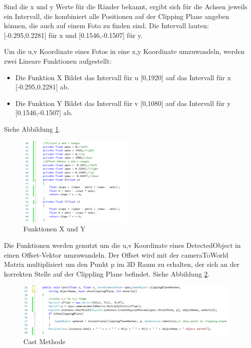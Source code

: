 \documentclass[german,a4paper, 12pt]{llncs}
\begin{document}
Sind die x und y Werte für die Ränder bekannt, ergibt sich für die Achsen jeweils ein Intervall, die kombiniert alle Positionen auf der Clipping Plane angeben können, die auch auf einem Foto zu finden sind. Die Intervall lauten: [-0.295,0.2281] für x und [0.1546,-0.1507] für y.

Um die u,v Koordinate eines Fotos in eine x,y Koordinate umzuwandeln, werden zwei Lineare Funktionen aufgestellt:
\begin{itemize}
	\item Die Funktion X Bildet das Intervall für u [0,1920] auf das Intervall für x [-0.295,0.2281] ab.
	\item Die Funktion Y Bildet das Intervall für v [0,1080] auf das Intervall für y [0.1546,-0.1507] ab.
\end{itemize}
Siehe Abbildung \ref{code:uvtoxy}.
\begin{figure}[H]
	\centering
	\includegraphics[width=0.5\textwidth]{images/code_uv_to_xy_scale.PNG}
	\caption[]{Funktionen X und Y}
	\label{code:uvtoxy}
\end{figure}

Die Funktionen werden genutzt um die u,v Koordinate eines DetectedObject in einen Offset-Vektor umzuwandeln. Der Offset wird mit der cameraToWorld Matrix multipliziert um den Punkt p im 3D Raum zu erhalten, der sich an der korrekten Stelle auf der Clippling Plane befindet. Siehe Abbildung \ref{code:castmethod}.

\begin{figure}[H]
	\centering
	\includegraphics[width=1.1\textwidth]{images/code_cast_method.PNG}
	\caption[]{Cast Methode}
	\label{code:castmethod}
\end{figure}
\end{document}
